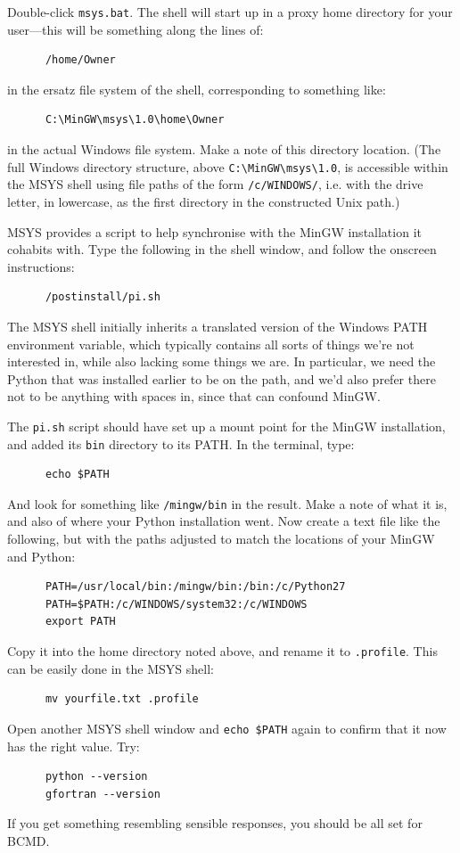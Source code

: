 \documentclass[a4paper,11pt]{article}
\begin{document}
Double-click \texttt{msys.bat}. The shell will start up in a proxy home directory for your user---this will be something along the lines of:
\begin{verbatim}
      /home/Owner
\end{verbatim}
in the ersatz file system of the shell, corresponding to something like:
\begin{verbatim}
      C:\MinGW\msys\1.0\home\Owner
\end{verbatim}
in the actual Windows file system. Make a note of this directory location. (The full Windows directory structure, above \texttt{C:\textbackslash{}MinGW\textbackslash{}msys\textbackslash{}1.0}, is accessible within the MSYS shell using file paths of the form \texttt{/c/WINDOWS/}, i.e. with the drive letter, in lowercase, as the first directory in the constructed Unix path.)

MSYS provides a script to help synchronise with the MinGW installation it cohabits with. Type the following in the shell window, and follow the onscreen instructions:
\begin{verbatim}
      /postinstall/pi.sh
\end{verbatim}
The MSYS shell initially inherits a translated version of the Windows PATH environment variable, which typically contains all sorts of things we're not interested in, while also lacking some things we are. In particular, we need the Python that was installed earlier to be on the path, and we'd also prefer there not to be anything with spaces in, since that can confound MinGW.

The \texttt{pi.sh} script should have set up a mount point for the MinGW installation, and added its \texttt{bin} directory to its PATH. In the terminal, type:
\begin{verbatim}
      echo $PATH
\end{verbatim}
And look for something like \texttt{/mingw/bin} in the result. Make a note of what it is, and also of where your Python installation went.
Now create a text file like the following, but with the paths adjusted to match the locations of your MinGW and Python:
\begin{verbatim}
      PATH=/usr/local/bin:/mingw/bin:/bin:/c/Python27
      PATH=$PATH:/c/WINDOWS/system32:/c/WINDOWS
      export PATH
\end{verbatim}
Copy it into the home directory noted above, and rename it to \texttt{.profile}. This can be easily done in the MSYS shell:
\begin{verbatim}
      mv yourfile.txt .profile
\end{verbatim}
Open another MSYS shell window and \texttt{echo \$PATH} again to confirm that it now has the right value. Try:
\begin{verbatim}
      python --version
      gfortran --version
\end{verbatim}
If you get something resembling sensible responses, you should be all set for BCMD.
\end{document}
